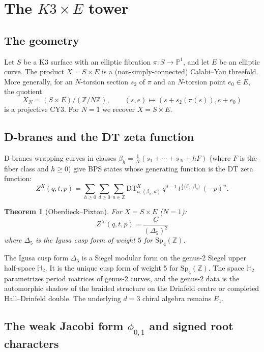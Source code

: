 \documentclass[11pt]{article}
\newtheorem{theorem}{Theorem}
\theoremstyle{definition}
\newcommand{\Sp}{\mathrm{Sp}}
\newcommand{\DT}{\mathrm{DT}}
\newcommand{\bZ}{\mathbb{Z}}
\newcommand{\bH}{\mathbb{H}}
\begin{document}
\section{The $K3 \times E$ tower}
\label{sec:k3-times-e}

\subsection{The geometry}

Let $S$ be a K3 surface with an elliptic
fibration $\pi \colon S \to \mathbb{P}^1$, and let $E$ be an
elliptic curve. The product $X = S \times E$ is a (non-simply-connected)
Calabi--Yau threefold. More generally, for an $N$-torsion section
$s_2$ of $\pi$ and an $N$-torsion point $e_0 \in E$, the quotient
\[
 X_N = (S \times E) / (\bZ/N\bZ),
 \qquad (s,e) \mapsto (s + s_2(\pi(s)), e + e_0)
\]
is a projective CY3. For $N=1$ we recover $X = S \times E$.

\subsection{D-branes and the DT zeta function}

D-branes wrapping curves in classes $\beta_h = \frac{1}{N}(s_1 +
\cdots + s_N + hF)$ (where $F$ is the fiber class and $h \geq 0$)
give BPS states whose generating function is the DT zeta function:
\[
 Z^X(q,t,p)
 = \sum_{h \geq 0} \sum_{d \geq 0} \sum_{n \in \bZ}
 \DT^X_{n,(\beta_h, d)} \, q^{d-1} \,
 t^{\frac{1}{2}\langle \beta_h, \beta_h \rangle} \, (-p)^n.
\]

\begin{theorem}[Oberdieck--Pixton]
For $X = S \times E$ ($N=1$):
\[
 Z^X(q,t,p) = \frac{C}{(\Delta_5)^2}
\]
where $\Delta_5$ is the Igusa cusp form of weight $5$ for
$\Sp_4(\bZ)$.
\end{theorem}

The Igusa cusp form $\Delta_5$ is a Siegel modular form on the
genus-2 Siegel upper half-space $\bH_2$. It is the unique cusp form
of weight 5 for $\Sp_4(\bZ)$. The space $\bH_2$ parametrizes period
matrices of genus-2 curves, and the genus-2 data is the automorphic
shadow of the braided structure on the Drinfeld centre or completed
Hall--Drinfeld double. The underlying $d=3$ chiral algebra remains
$E_1$.

\subsection{The weak Jacobi form $\phi_{0,1}$ and signed root characters}
\end{document}
